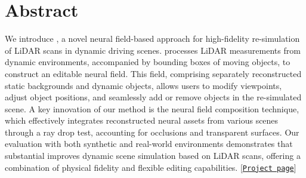 \section*{Abstract}
We introduce \dynfl, a novel neural field-based approach for high-fidelity re-simulation of LiDAR scans in dynamic driving scenes. \dynfl processes LiDAR measurements from dynamic environments, accompanied by bounding boxes of moving objects, to construct an editable neural field. This field, comprising separately reconstructed static backgrounds and dynamic objects, allows users to modify viewpoints, adjust object positions, and seamlessly add or remove objects in the re-simulated scene.
%
A key innovation of our method is the neural field composition technique, which effectively integrates reconstructed neural assets from various scenes through a ray drop test, accounting for occlusions and transparent surfaces.
Our evaluation with both synthetic and real-world environments demonstrates that \dynfl substantial improves dynamic scene simulation based on LiDAR scans, offering a combination of physical fidelity and flexible editing capabilities. [\href{https://shengyuh.github.io/dynfl/index.html}{\texttt{Project page}}]
